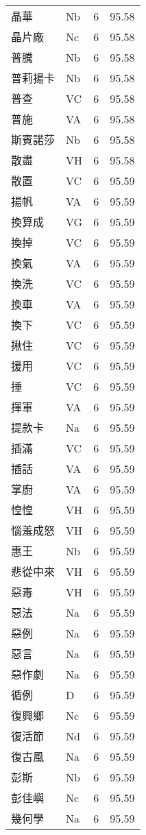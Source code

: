 \documentclass[twocolumn]{book}
\begin{document}
\begin{supertabular}{llrr}
晶華 & Nb & 6 &  95.58\\
晶片廠 & Nc & 6 &  95.58\\
普騰 & Nb & 6 &  95.58\\
普莉揚卡 & Nb & 6 &  95.58\\
普查 & VC & 6 &  95.58\\
普施 & VA & 6 &  95.58\\
斯賓諾莎 & Nb & 6 &  95.58\\
散盡 & VH & 6 &  95.58\\
散置 & VC & 6 &  95.59\\
揚帆 & VA & 6 &  95.59\\
換算成 & VG & 6 &  95.59\\
換掉 & VC & 6 &  95.59\\
換氣 & VA & 6 &  95.59\\
換洗 & VC & 6 &  95.59\\
換車 & VA & 6 &  95.59\\
換下 & VC & 6 &  95.59\\
揪住 & VC & 6 &  95.59\\
援用 & VC & 6 &  95.59\\
捶 & VC & 6 &  95.59\\
揮軍 & VA & 6 &  95.59\\
提款卡 & Na & 6 &  95.59\\
插滿 & VC & 6 &  95.59\\
插話 & VA & 6 &  95.59\\
掌廚 & VA & 6 &  95.59\\
惶惶 & VH & 6 &  95.59\\
惱羞成怒 & VH & 6 &  95.59\\
惠王 & Nb & 6 &  95.59\\
悲從中來 & VH & 6 &  95.59\\
惡毒 & VH & 6 &  95.59\\
惡法 & Na & 6 &  95.59\\
惡例 & Na & 6 &  95.59\\
惡言 & Na & 6 &  95.59\\
惡作劇 & Na & 6 &  95.59\\
循例 & D & 6 &  95.59\\
復興鄉 & Nc & 6 &  95.59\\
復活節 & Nd & 6 &  95.59\\
復古風 & Na & 6 &  95.59\\
彭斯 & Nb & 6 &  95.59\\
彭佳嶼 & Nc & 6 &  95.59\\
幾何學 & Na & 6 &  95.59\\

\end{supertabular}
\end{document}
